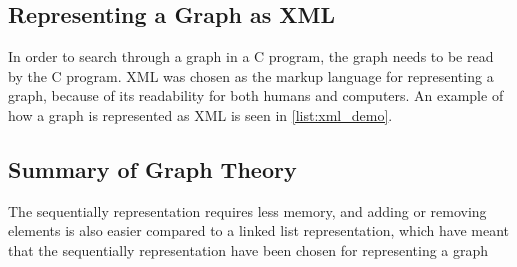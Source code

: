 












\subsection{Representing a Graph as XML}

In order to search through a graph in a C program, the graph needs to be read by the C program. XML was chosen as the markup language for representing a graph, because of its readability for both humans and computers. An example of how a graph is represented as XML is seen in \cref{list:xml_demo}.



\subsection{Summary of Graph Theory}

The sequentially representation requires less memory, and adding or removing elements is also easier compared to a linked list representation, which have meant that the sequentially representation have been chosen for representing a graph 